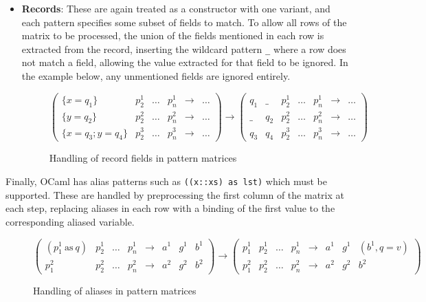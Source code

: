 \begin{itemize}
\item \textbf{Records}: These are again treated as a constructor with one variant, and each pattern specifies some subset of fields to match. To allow all rows of the matrix to be processed,  the union of the fields mentioned in each row is extracted from the record, inserting the wildcard pattern \verb|_| where a row does not match a field, allowing the value extracted for that field to be ignored. In the example below, any unmentioned fields are ignored entirely.
\begin{figure}[H]
\hfill
$
\begin{pmatrix}
\{x=q_1\} & p^1_2 & \dots & p^1_n & \to & \dots \\
\{y=q_2\} & p^2_2 & \dots & p^2_n & \to &\dots \\
\{x=q_3; y=q_4\} & p^3_2 & \dots & p^3_n & \to &\dots
\end{pmatrix}
\to
\begin{pmatrix}
q_1 & \_ & p^1_2 & \dots & p^1_n  & \to & \dots \\
\_ & q_2 & p^2_2 & \dots & p^2_n  & \to & \dots \\
 q_3 & q_4 & p^3_2 & \dots & p^3_n  & \to & \dots
\end{pmatrix}
$
\hfill
\caption{Handling of record fields in pattern matrices}
\end{figure}
\end{itemize}


Finally, OCaml has alias patterns such as \verb|((x::xs) as lst)| which must be supported. These are handled by preprocessing the first column of the matrix at each step, replacing aliases in each row with a binding of the first value to the corresponding aliased variable. %

\begin{figure}[H]
$
\begin{pmatrix}
(p^1_1\ \mathrm{as}\ q) & p^1_2 & \dots & p^1_n & \to & a^1 & g^1 & b^1 \\
p^2_1 & p^2_2 & \dots & p^2_n & \to & a^2 & g^2 & b^2
\end{pmatrix}
\to
\begin{pmatrix}
 p^1_1 & p^1_2 & \dots & p^1_n  & \to & a^1 & g^1 & (b^1, q=v) \\
p^2_1 & p^2_2 & \dots & p^2_n  & \to & a^2 & g^2 & b^2
\end{pmatrix}
$
\caption{Handling of aliases in pattern matrices}
\end{figure}

